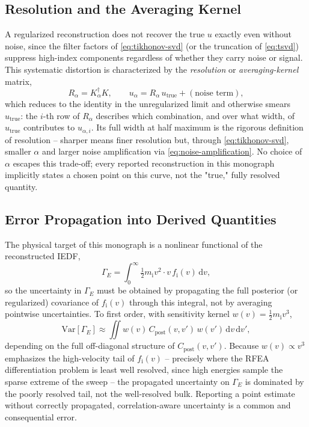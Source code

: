 \subsection{Resolution and the Averaging Kernel}

A regularized reconstruction does not recover the true $u$ exactly even without noise, since the filter factors of \cref{eq:tikhonov-svd} (or the truncation of \cref{eq:tsvd}) suppress high-index components regardless of whether they carry noise or signal. This systematic distortion is characterized by the \emph{resolution} or \emph{averaging-kernel} matrix,
\begin{equation}
R_{\alpha} = K_{\alpha}^{\dagger} K, \qquad u_{\alpha} = R_{\alpha}\, u_{\mathrm{true}} + \left(\text{noise term}\right),
\label{eq:resolution-matrix}
\end{equation}
which reduces to the identity in the unregularized limit and otherwise smears $u_{\mathrm{true}}$: the $i$-th row of $R_\alpha$ describes which combination, and over what width, of $u_{\mathrm{true}}$ contributes to $u_{\alpha,i}$. Its full width at half maximum is the rigorous definition of resolution -- sharper means finer resolution but, through \cref{eq:tikhonov-svd}, smaller $\alpha$ and larger noise amplification via \cref{eq:noise-amplification}. No choice of $\alpha$ escapes this trade-off; every reported reconstruction in this monograph implicitly states a chosen point on this curve, not the "true," fully resolved quantity.

\subsection{Error Propagation into Derived Quantities}

The physical target of this monograph is a nonlinear functional of the reconstructed IEDF,
\begin{equation}
\Gamma_{E} = \int_{0}^{\infty} \tfrac{1}{2} m_{\mathrm{i}} v^{2} \cdot v\, f_{\mathrm{i}}(v)\, \mathrm{d}v,
\label{eq:energy-flux-functional}
\end{equation}
so the uncertainty in $\Gamma_{E}$ must be obtained by propagating the full posterior (or regularized) covariance of $f_{\mathrm{i}}(v)$ through this integral, not by averaging pointwise uncertainties. To first order, with sensitivity kernel $w(v) = \tfrac{1}{2}m_{\mathrm{i}}v^{3}$,
\begin{equation}
\mathrm{Var}[\Gamma_{E}] \approx \iint w(v)\, C_{\mathrm{post}}(v,v')\, w(v')\, \mathrm{d}v\, \mathrm{d}v',
\label{ch14-eq:error-propagation}
\end{equation}
depending on the full off-diagonal structure of $C_{\mathrm{post}}(v,v')$. Because $w(v) \propto v^3$ emphasizes the high-velocity tail of $f_{\mathrm{i}}(v)$ -- precisely where the RFEA differentiation problem is least well resolved, since high energies sample the sparse extreme of the sweep -- the propagated uncertainty on $\Gamma_{E}$ is dominated by the poorly resolved tail, not the well-resolved bulk. Reporting a point estimate without correctly propagated, correlation-aware uncertainty is a common and consequential error.

